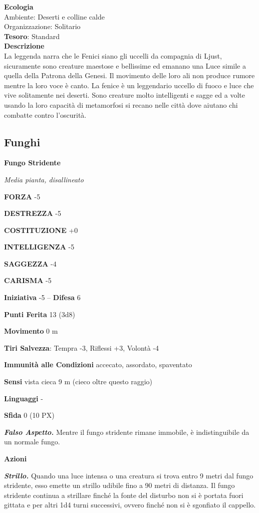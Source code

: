 \begin{multicols}{2}
	\textbf{Ecologia}\\
	Ambiente: Deserti e colline calde\\
	Organizzazione: Solitario\\
	\textbf{Tesoro}: Standard\\
	\textbf{Descrizione}\\
	La leggenda narra che le Fenici siano gli uccelli da compagnia di Ljust, sicuramente sono creature maestose e bellissime ed emanano una Luce simile a quella della Patrona della Genesi. Il movimento delle loro ali non produce rumore mentre la loro voce è canto. La fenice è un leggendario uccello di fuoco e luce che vive solitamente nei deserti. Sono creature molto intelligenti e sagge ed a volte usando la loro capacità di metamorfosi si recano nelle città dove aiutano chi combatte contro l'oscurità.

	\subsection{Funghi}

	\medskip{}\textbf{Fungo Stridente}

	\textit{Media pianta, disallineato}

	\textbf{FORZA} -5

	\textbf{DESTREZZA} -5

	\textbf{COSTITUZIONE} +0

	\textbf{INTELLIGENZA} -5

	\textbf{SAGGEZZA} -4

	\textbf{CARISMA} -5

	\textbf{Iniziativa} -5 -- \textbf{Difesa} 6

	\textbf{Punti Ferita} 13 (3d8)

	\textbf{Movimento} 0 m

	\textbf{Tiri Salvezza}: Tempra -3, Riflessi +3, Volontà -4

	\textbf{Immunità alle Condizioni} accecato, assordato, spaventato

	\textbf{Sensi} vista cieca 9 m (cieco oltre questo raggio)

	\textbf{Linguaggi} -

	\textbf{Sfida} 0 (10 PX)

	\textit{\textbf{Falso Aspetto.}} Mentre il fungo stridente rimane immobile, è indistinguibile da un normale fungo.

	\textbf{Azioni}

	\textit{\textbf{Strillo.}} Quando una luce intensa o una creatura si trova entro 9 metri dal fungo stridente, esso emette un strillo udibile fino a 90 metri di distanza. Il fungo stridente continua a strillare finché la fonte del disturbo non si è portata fuori gittata e per altri 1d4 turni successivi, ovvero finché non si è sgonfiato il cappello.


\end{multicols}
